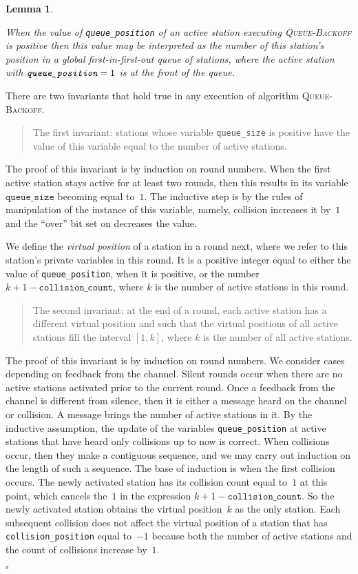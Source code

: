 \documentclass[11pt]{article}
\newcommand{\qed}{\hfill $\square$ \smallbreak}
\newenvironment{proof}{\noindent{\bf Proof:}}{\qed}
\newtheorem{lemma}{Lemma}
\begin{document}
\begin{lemma}
\label{lem:queue}

When the value of \emph{\texttt{queue\_position}} of an active station executing \textsc{Queue-Backoff} is positive then this value may be interpreted as the number of this station's position in a global first-in-first-out queue of stations, where the active station with $\emph{\texttt{queue\_position}} = 1$ is at the front of the queue.
\end{lemma}

\begin{proof} 
There are two invariants that hold true in any execution of algorithm \textsc{Queue-Backoff}.
\begin{quote}
\textsf{The first invariant:} stations whose variable \texttt{queue\_size} is positive have the value of this variable equal to  the number of active stations.
\end{quote}
The proof of this invariant is by induction on round numbers.
When the first active station stays active for at least two rounds, then this results in its variable $\texttt{queue\_size}$ becoming equal to~$1$.
 The inductive step is by the rules of manipulation of the instance of this variable, namely, collision increases it by~$1$  and the ``over'' bit set on decreases the value.

We define the \emph{virtual position} of a station in a round next, where we refer to this station's private variables in this round.
It is a positive integer equal to either the value of \texttt{queue\_position}, when it is positive, or the number $k +1 - \texttt{collision\_count}$, where $k$ is the number of active stations in this round.

\begin{quote}
\textsf{The second invariant:} at the end of a round, each active station has a different virtual position and such that the virtual positions of all active stations fill the interval $[1,k]$, where $k$ is the number of all active stations.
 \end{quote}
The proof of this invariant is by induction on round numbers.
We consider cases depending on feedback from the channel.
Silent rounds occur when there are no active stations activated prior to the current round.
Once a feedback from the channel is different from silence, then it is either a message heard on the channel or collision.
A message brings the number of active stations in it.
By the inductive assumption, the update of the variables \texttt{queue\_position} at active stations that have heard only collisions up to now is correct.
When collisions occur, then they make a contiguous sequence, and we may carry out induction on the length of such a sequence.
The base of induction is when the first collision occurs.
The newly activated station has its collision count equal to~$1$ at this point, which cancels the~$1$ in the expression $k +1 - \texttt{collision\_count}$.
So the newly activated station obtains the virtual position~$k$ as the only station.
Each subsequent collision does not affect the virtual position of a station that has  \texttt{collision\_position} equal to~$-1$ because both the number of active stations and  the count of collisions increase by~$1$.


\end{proof}
\end{document}
